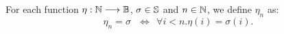 \begin{defn}
  \label{def:etaprefix}
For each function $\eta : \mathbb{N} \longrightarrow \mathbb{B}$,
$\sigma \in \mathbb{S}$ and $n \in \mathbb{N}$, we define $\eta_n$ as:
$$
\eta_n = \sigma \ \ \ \Leftrightarrow \ \ \forall i<n. \eta(i)=
{\sigma(i)}.
$$
\end{defn}
%
%
\noindent






